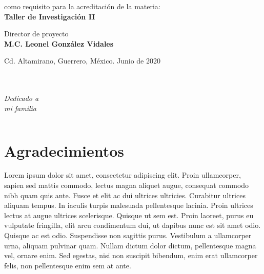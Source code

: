 \documentclass[letterpaper,oneside,openany,11pt]{book}
\begin{document}
\begin{titlepage}
\begin{center}
		\begin{large}
			como requisito para la acreditación de la materia: \\
			\vspace*{0.1in}
			\textbf{Taller de Investigación II} \\
		\end{large}
		\vspace*{0.4in}
		
		\begin{large}
			Director de proyecto \\
			\vspace*{0.1in}
			\textbf{M.C. Leonel González Vidales} \\
		\end{large}
		\vspace*{0.4in}
	
		
		\vspace*{0.25in}
		\small
		Cd. Altamirano, Guerrero, México. \hfill Junio de 2020\\
		
	\end{center}
	
\end{titlepage}

\newpage
$\ $
\thispagestyle{empty} %

\chapter*{}

\begin{flushright}
 	\textit{Dedicado a \\
		mi familia}
 \end{flushright}
\thispagestyle{empty} %
 
\newpage
$\ $
\thispagestyle{empty} %

\chapter*{Agradecimientos} %
\noindent Lorem ipsum dolor sit amet, consectetur adipiscing elit. Proin ullamcorper, sapien sed mattis commodo, lectus magna aliquet augue, consequat commodo nibh quam quis ante. Fusce et elit ac dui ultrices ultricies. Curabitur ultrices aliquam tempus. In iaculis turpis malesuada pellentesque lacinia. Proin ultrices lectus at augue ultrices scelerisque. Quisque ut sem est. Proin laoreet, purus eu vulputate fringilla, elit arcu condimentum dui, ut dapibus nunc est sit amet odio. Quisque ac est odio. Suspendisse non sagittis purus. Vestibulum a ullamcorper urna, aliquam pulvinar quam. Nullam dictum dolor dictum, pellentesque magna vel, ornare enim. Sed egestas, nisi non suscipit bibendum, enim erat ullamcorper felis, non pellentesque enim sem at ante. \\
\end{document}
